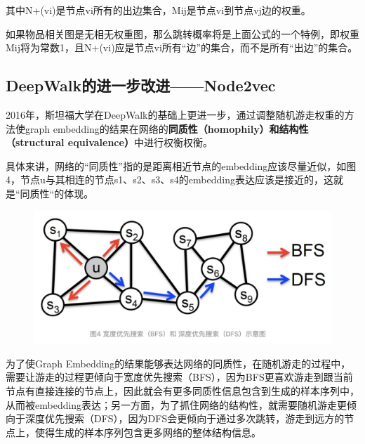 \documentclass[12pt]{article}
\begin{document}
其中N+(vi)是节点vi所有的出边集合，Mij是节点vi到节点vj边的权重。

如果物品相关图是无相无权重图，那么跳转概率将是上面公式的一个特例，即权重Mij将为常数1，且N+(vi)应是节点vi所有“边”的集合，而不是所有“出边”的集合。

\subsection{DeepWalk的进一步改进——Node2vec}
2016年，斯坦福大学在DeepWalk的基础上更进一步，通过调整随机游走权重的方法使graph embedding的结果在网络的\textbf{同质性（homophily）和结构性（structural equivalence）}中进行权衡权衡。

具体来讲，网络的“同质性”指的是距离相近节点的embedding应该尽量近似，如图4，节点u与其相连的节点s1、s2、s3、s4的embedding表达应该是接近的，这就是“同质性“的体现。
\begin{figure}[H]
    \centering
    \includegraphics[width=.6\textwidth]{fig/Graph_Embedding_BFS_DFS.png}
\end{figure}

为了使Graph Embedding的结果能够表达网络的同质性，在随机游走的过程中，需要让游走的过程更倾向于宽度优先搜索（BFS），因为BFS更喜欢游走到跟当前节点有直接连接的节点上，因此就会有更多同质性信息包含到生成的样本序列中，从而被embedding表达；另一方面，为了抓住网络的结构性，就需要随机游走更倾向于深度优先搜索（DFS），因为DFS会更倾向于通过多次跳转，游走到远方的节点上，使得生成的样本序列包含更多网络的整体结构信息。
\end{document}
